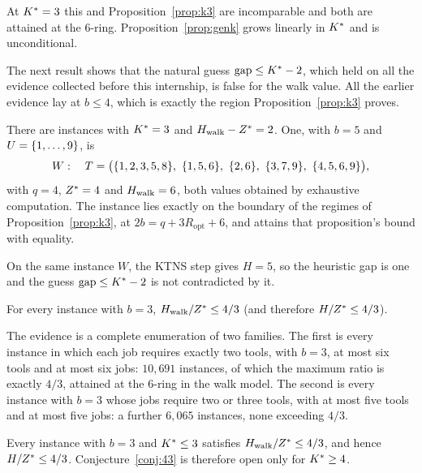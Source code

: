 At $K^{\ast}=3$ this and Proposition~\ref{prop:k3} are incomparable and both are attained
at the $6$-ring. Proposition~\ref{prop:genk} grows linearly in $K^{\ast}$ and is
unconditional.

The next result shows that the natural guess $\mathrm{gap}\le K^{\ast}-2$, which held on
all the evidence collected before this internship, is false for the walk value. All
the earlier evidence lay at $b\le4$, which is exactly the region
Proposition~\ref{prop:k3} proves.

\begin{observation}\label{obs:refute}
There are instances with $K^{\ast}=3$ and $H_{\mathrm{walk}}-Z^{\ast}=2$. One, with $b=5$ and
$U=\{1,\dots,9\}$, is
\[
  W:\quad T=\bigl(\rset{1,2,3,5,8},\ \rset{1,5,6},\ \rset{2,6},\ \rset{3,7,9},\
  \rset{4,5,6,9}\bigr),
\]
with $q=4$, $Z^{\ast}=4$ and $H_{\mathrm{walk}}=6$, both values obtained by exhaustive computation.
The instance lies exactly on the boundary of the regimes of
Proposition~\ref{prop:k3}, at $2b=q+3R_{\mathrm{opt}}+6$, and attains that
proposition's bound with equality.
\end{observation}

\begin{observation}\label{obs:refute-ktns}
On the same instance $W$, the KTNS step gives $H=5$, so the heuristic gap is one and
the guess $\mathrm{gap}\le K^{\ast}-2$ is not contradicted by it.
\end{observation}

\begin{conjecture}[The $4/3$ walk ratio at $b=3$]\label{conj:43}
For every instance with $b=3$, $H_{\mathrm{walk}}/Z^{\ast}\le4/3$ (and therefore
$H/Z^{\ast}\le4/3$).
\end{conjecture}

The evidence is a complete enumeration of two families. The first is every instance
in which each job requires exactly two tools, with $b=3$, at most six tools and at
most six jobs: $10{,}691$ instances, of which the maximum ratio is exactly $4/3$,
attained at the $6$-ring in the walk model. The second is every instance with $b=3$
whose jobs require two or three tools, with at most five tools and at most five jobs:
a further $6{,}065$ instances, none exceeding $4/3$.

\begin{proposition}\label{prop:43route}
Every instance with $b=3$ and $K^{\ast}\le3$ satisfies $H_{\mathrm{walk}}/Z^{\ast}\le4/3$, and hence
$H/Z^{\ast}\le4/3$. Conjecture~\ref{conj:43} is therefore open only for $K^{\ast}\ge4$.
\end{proposition}

